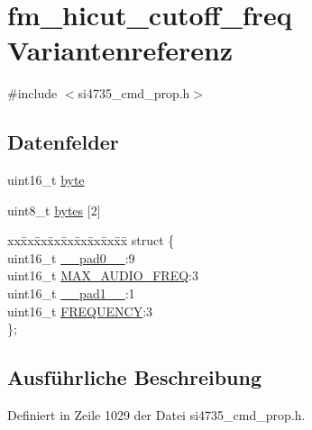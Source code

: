 \hypertarget{unionfm__hicut__cutoff__freq}{}\section{fm\+\_\+hicut\+\_\+cutoff\+\_\+freq Variantenreferenz}
\label{unionfm__hicut__cutoff__freq}


{\ttfamily \#include $<$si4735\+\_\+cmd\+\_\+prop.\+h$>$}

\subsection*{Datenfelder}
\begin{DoxyCompactItemize}
\item 
uint16\+\_\+t \hyperlink{unionfm__hicut__cutoff__freq_ab0549c1b5ea980a02e7eab77e21fea49}{byte}
\item 
uint8\+\_\+t \hyperlink{unionfm__hicut__cutoff__freq_a46e4c05d20a047ec169f60d3167e912e}{bytes} \mbox{[}2\mbox{]}
\item 
\begin{tabbing}
xx\=xx\=xx\=xx\=xx\=xx\=xx\=xx\=xx\=\kill
struct \{\\
\>uint16\_t \hyperlink{unionfm__hicut__cutoff__freq_a77132c2c26a75f5b8751b235cda23828}{\_\_pad0\_\_}:9\\
\>uint16\_t \hyperlink{unionfm__hicut__cutoff__freq_aada3ed206e51efd8ab2ef338686c3a33}{MAX\_AUDIO\_FREQ}:3\\
\>uint16\_t \hyperlink{unionfm__hicut__cutoff__freq_ab72e3a1f2f7db8695c60c658f5a0f11a}{\_\_pad1\_\_}:1\\
\>uint16\_t \hyperlink{unionfm__hicut__cutoff__freq_ae5c18357d97abed93b49dc2a61421ace}{FREQUENCY}:3\\
\}; \\

\end{tabbing}\end{DoxyCompactItemize}


\subsection{Ausführliche Beschreibung}


Definiert in Zeile 1029 der Datei si4735\+\_\+cmd\+\_\+prop.\+h.



